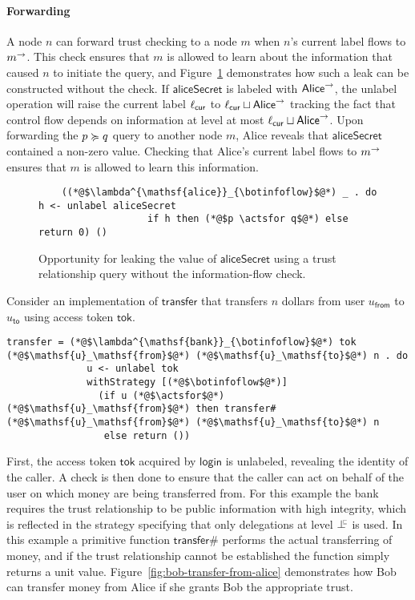 \paragraph{Forwarding}
A node $n$ can forward trust checking to a node $m$ when $n$'s current label flows to $m^{\rightarrow}$. This check ensures that $m$ is allowed to learn about the information that caused $n$ to initiate the query, and Figure~\ref{fig:leak-via-forward} demonstrates how such a leak can be constructed without the check. If $\mathsf{aliceSecret}$ is labeled with $\mathsf{Alice}^{\rightarrow}$, the unlabel operation will raise the current label $\ell_{\mathsf{cur}}$ to $\ell_{\mathsf{cur}} \sqcup \mathsf{Alice}^{\rightarrow}$ tracking the fact that control flow depends on information at level at most $\ell_{\mathsf{cur}} \sqcup \mathsf{Alice}^{\rightarrow}$. Upon forwarding the $p \succcurlyeq q$ query to another node $m$, Alice reveals that $\mathsf{aliceSecret}$ contained a non-zero value. Checking that Alice's current label flows to $m^{\rightarrow}$ ensures that $m$ is allowed to learn this information.

\begin{figure}
    \centering
    \begin{lstlisting}
    ((*@$\lambda^{\mathsf{alice}}_{\botinfoflow}$@*) _ . do h <- unlabel aliceSecret
                   if h then (*@$p \actsfor q$@*) else return 0) ()
    \end{lstlisting}
    \caption{Opportunity for leaking the value of $\mathsf{aliceSecret}$ using a trust relationship query without the information-flow check.}
    \label{fig:leak-via-forward}
\end{figure}

Consider an implementation of $\mathsf{transfer}$ that transfers $n$ dollars from user $u_\mathsf{from}$ to $u_\mathsf{to}$ using access token $\mathsf{tok}$.

\begin{lstlisting}
transfer = (*@$\lambda^{\mathsf{bank}}_{\botinfoflow}$@*) tok (*@$\mathsf{u}_\mathsf{from}$@*) (*@$\mathsf{u}_\mathsf{to}$@*) n . do
              u <- unlabel tok
              withStrategy [(*@$\botinfoflow$@*)]
                (if u (*@$\actsfor$@*) (*@$\mathsf{u}_\mathsf{from}$@*) then transfer# (*@$\mathsf{u}_\mathsf{from}$@*) (*@$\mathsf{u}_\mathsf{to}$@*) n
                 else return ())
\end{lstlisting}

First, the access token $\mathsf{tok}$ acquired by $\mathsf{login}$ is unlabeled, revealing the identity of the caller. A check is then done to ensure that the caller can act on behalf of the user on which money are being transferred from. For this example the bank requires the trust relationship to be public information with high integrity, which is reflected in the strategy specifying that only delegations at level $\botinfoflow$ is used. In this example a primitive function $\mathsf{transfer\#}$ performs the actual transferring of money, and if the trust relationship cannot be established the function simply returns a unit value. Figure~\ref{fig:bob-transfer-from-alice} demonstrates how Bob can transfer money from Alice if she grants Bob the appropriate trust.


